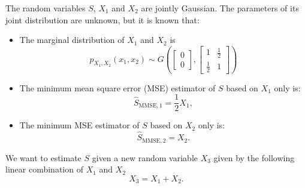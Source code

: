\begin{solution}
\end{solution}

\else

\question[20] %

The random variables $S$, $X_1$ and $X_2$ are jointly Gaussian. The parameters of its joint distribution are unknown, but it is known that:
\begin{itemize}
\item The marginal distribution of $X_1$ and $X_2$ is
$$p_{X_1,X_2}\left ( x_1,x_2\right) \sim G\left (  \left[ \begin{array}{c}   0 \\ 0    \end{array} \right] , \left[ \begin{array}{cc}  1 & \frac{1}{2} \\ \frac{1}{2} & 1  \end{array} \right]\right)$$
\item The minimum mean square error (MSE) estimator of $S$ based on $X_1$ only is:
$$\widehat S_{\text{MMSE},1}=\frac{1}{2} X_1,$$
\item The minimum MSE estimator of $S$ based on $X_2$ only is:
$$\widehat S_{\text{MMSE},2}= X_2.$$
\end{itemize}

We want to estimate $S$ given a new random variable $X_3$ given by the following linear combination of $X_1$ and $X_2$
$$X_3= X_1 +  X_2.$$

